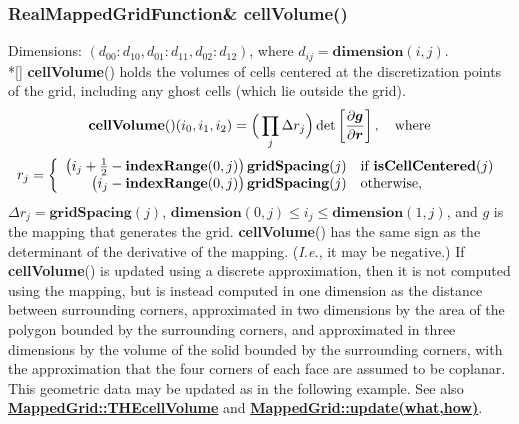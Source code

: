 \documentclass{article}
\begin{document}
  \subsubsection{RealMappedGridFunction\& cellVolume()}
  \label{MappedGrid::cellVolume()}
    Dimensions: $(d_{00}\colon d_{10},d_{01}\colon d_{11},d_{02}\colon d_{12})$,
    where $d_{ij} = \textbf{dimension}(i,j)$. \\*[\parskip]
    \textbf{cellVolume}() holds the volumes of cells centered at the discretization points of the grid, including any ghost cells (which lie outside the grid).
    \[
      \textbf{cellVolume}()(i_0,i_1,i_2) = \Big(\prod_j\Delta r_j\Big) \det\left[{\partial\mbox{\boldmath$g$} \over \partial\mbox{\boldmath$r$}}\right],
      \quad\mbox{where}
    \]
    \[
      r_j = \left\{ \begin{array}{rl}
        \big(i_j + {1\over2} - \textbf{indexRange}(0,j)\big)\,\textbf{gridSpacing}(j) & \mbox{if \bf{}isCellCentered}(j) \\
        \big(i_j             - \textbf{indexRange}(0,j)\big)\,\textbf{gridSpacing}(j) & \mbox{otherwise},                \\
      \end{array} \right.
    \]
    $\Delta r_j = \textbf{gridSpacing}(j)$,
    $\textbf{dimension}(0,j) \le i_j \le \textbf{dimension}(1,j)$, and {\boldmath $g$} is the mapping that generates the grid.
    \textbf{cellVolume}() has the same sign as the determinant of the derivative of the mapping.  ({\sl I.e.}, it may be negative.)
    If \textbf{cellVolume}() is updated using a discrete approximation, then it is not computed using the mapping, but is instead
    computed in one dimension as the distance between surrounding corners, approximated in two dimensions by the area of the
    polygon bounded by the surrounding corners, and approximated in three dimensions by the volume of the solid bounded by the
    surrounding corners, with the approximation that the four corners of each face are assumed to be coplanar.
    This geometric data may be updated as in the following example.
    See also {\bf{}\hyperref{THEcellVolume}{THEcellVolume \rm(\S}{)}{MappedGrid::THEcellVolume}}
    and {\bf{}\hyperref{update(what,how)}{update(what,how) \rm(\S}{)}{MappedGrid::update(what,how)}}.
\end{document}

